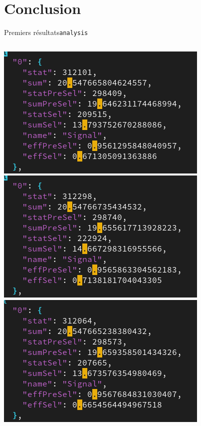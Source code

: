 \documentclass[9pt]{beamer}
\begin{document}

\section{Conclusion}

\begin{frame}{Premiers résultats}{\texttt{analysis}}

	\begin{columns}
    
        \begin{column}{0.3\textwidth}
				\includegraphics[height=0.25\textheight]{../img/bb_original_run_1.png}
				\includegraphics[height=0.25\textheight]{../img/bb_original_run_2.png}
				\includegraphics[height=0.25\textheight]{../img/bb_original_run_3.png}
        \end{column}
        

\end{columns}
\end{frame}
\end{document}
